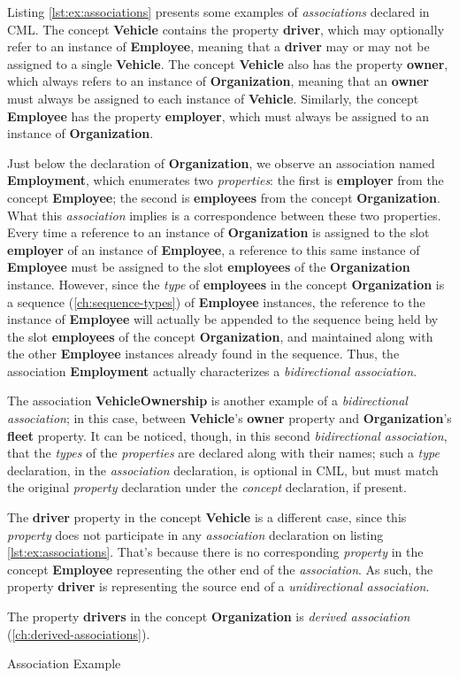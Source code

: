 Listing \ref{lst:ex:associations} presents some examples of \emph{associations} declared in CML.
The concept \textbf{Vehicle} contains the property \textbf{driver},
which may optionally refer to an instance of \textbf{Employee},
meaning that a \textbf{driver} may or may not be assigned to a single \textbf{Vehicle}.
The concept \textbf{Vehicle} also has the property \textbf{owner},
which always refers to an instance of \textbf{Organization},
meaning that an \textbf{owner} must always be assigned to each instance of \textbf{Vehicle}. 
Similarly,
the concept \textbf{Employee} has the property \textbf{employer},
which must always be assigned to an instance of \textbf{Organization}.

Just below the declaration of \textbf{Organization},
we observe an association named \textbf{Employment},
which enumerates two \emph{properties}:
the first is \textbf{employer} from the concept \textbf{Employee};
the second is \textbf{employees} from the concept \textbf{Organization}.
What this \emph{association} implies is a correspondence between these two properties.
Every time a reference to an instance of \textbf{Organization} is assigned to
the slot \textbf{employer} of an instance of \textbf{Employee},
a reference to this same instance of \textbf{Employee} must be assigned to
the slot \textbf{employees} of the \textbf{Organization} instance.
However,
since the \emph{type} of \textbf{employees}
in the concept \textbf{Organization}
is a sequence (\ref{ch:sequence-types}) of \textbf{Employee} instances,
the reference to the instance of \textbf{Employee} will actually be appended to the sequence
being held by the slot \textbf{employees} of the concept \textbf{Organization},
and maintained along with the other \textbf{Employee} instances already found in the sequence.
Thus, the association \textbf{Employment} actually characterizes a \emph{bidirectional association}.

The association \textbf{VehicleOwnership} is another example of a \emph{bidirectional association};
in this case,
between \textbf{Vehicle}'s \textbf{owner} property and \textbf{Organization}'s \textbf{fleet} property.
It can be noticed, though, 
in this second \emph{bidirectional association},
that the \emph{types} of the \emph{properties} are declared along with their names;
such a \emph{type} declaration,
in the \emph{association} declaration,
is optional in CML,
but must match the original \emph{property} declaration under the \emph{concept} declaration,
if present.

The \textbf{driver} property in the concept \textbf{Vehicle} is a different case,
since this \emph{property} does not participate in any \emph{association} declaration
on listing \ref{lst:ex:associations}.
That's because there is no corresponding \emph{property} in the concept \textbf{Employee}
representing the other end of the \emph{association}.
As such, the property \textbf{driver} is representing the source end of a \emph{unidirectional association}.

The property \textbf{drivers} in the concept \textbf{Organization}
is \emph{derived association} (\ref{ch:derived-associations}).

\begin{code}
\verbatimfont{\small}

\caption{Association Example}
\label{lst:ex:associations}
\end{code}
